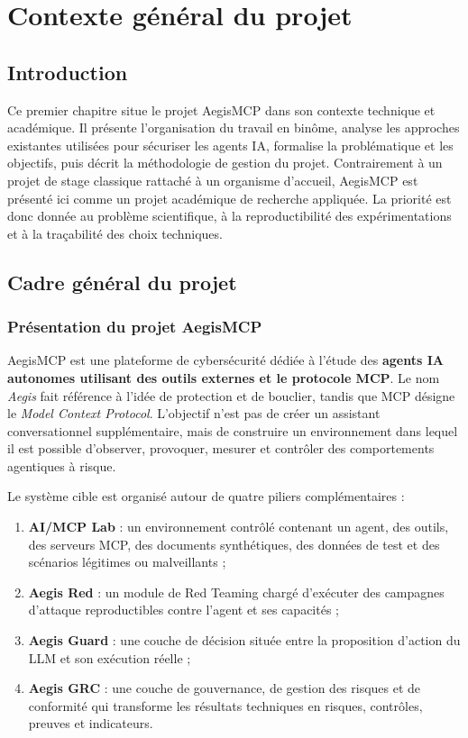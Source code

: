 \chapter{Contexte général du projet}

\section*{Introduction}

Ce premier chapitre situe le projet AegisMCP dans son contexte technique et académique. Il présente l'organisation du travail en binôme, analyse les approches existantes utilisées pour sécuriser les agents IA, formalise la problématique et les objectifs, puis décrit la méthodologie de gestion du projet. Contrairement à un projet de stage classique rattaché à un organisme d'accueil, AegisMCP est présenté ici comme un projet académique de recherche appliquée. La priorité est donc donnée au problème scientifique, à la reproductibilité des expérimentations et à la traçabilité des choix techniques.

\section{Cadre général du projet}

\subsection{Présentation du projet AegisMCP}

AegisMCP est une plateforme de cybersécurité dédiée à l'étude des \textbf{agents IA autonomes utilisant des outils externes et le protocole MCP}. Le nom \emph{Aegis} fait référence à l'idée de protection et de bouclier, tandis que MCP désigne le \textit{Model Context Protocol}. L'objectif n'est pas de créer un assistant conversationnel supplémentaire, mais de construire un environnement dans lequel il est possible d'observer, provoquer, mesurer et contrôler des comportements agentiques à risque.

Le système cible est organisé autour de quatre piliers complémentaires :

\begin{enumerate}[label=\arabic*.]
    \item \textbf{AI/MCP Lab} : un environnement contrôlé contenant un agent, des outils, des serveurs MCP, des documents synthétiques, des données de test et des scénarios légitimes ou malveillants ;
    \item \textbf{Aegis Red} : un module de Red Teaming chargé d'exécuter des campagnes d'attaque reproductibles contre l'agent et ses capacités ;
    \item \textbf{Aegis Guard} : une couche de décision située entre la proposition d'action du LLM et son exécution réelle ;
    \item \textbf{Aegis GRC} : une couche de gouvernance, de gestion des risques et de conformité qui transforme les résultats techniques en risques, contrôles, preuves et indicateurs.
\end{enumerate}

